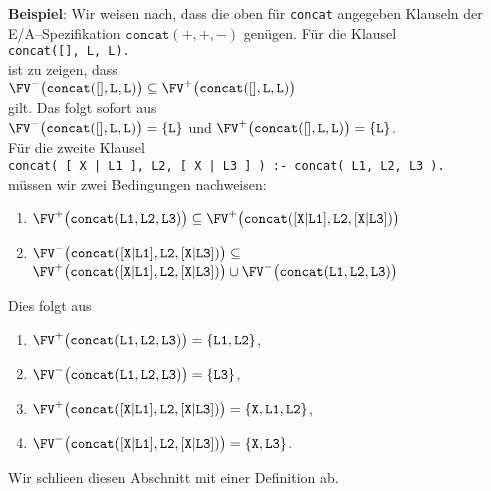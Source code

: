 \noindent
\textbf{Beispiel}: Wir weisen nach, dass die oben f\"{u}r \texttt{concat} angegeben Klauseln der E/A--Spezifikation
$\texttt{concat}(+,+,-)$ gen\"{u}gen. F\"{u}r die Klausel \\[0.1cm]
\hspace*{1.3cm} \texttt{concat([], L, L).} \\[0.1cm]
ist zu zeigen, dass \\[0.1cm]
\hspace*{1.3cm} $\FV^-\big(\mathtt{concat}(\mathtt{[]}, \mathtt{L}, \mathtt{L})\big) \subseteq \FV^+\big(\mathtt{concat}(\mathtt{[]}, \mathtt{L}, \mathtt{L})\big)$ \\[0.1cm]
gilt.  Das folgt sofort aus \\[0.1cm]
\hspace*{1.3cm}  $\FV^-\big(\mathtt{concat}(\mathtt{[]}, \mathtt{L}, \mathtt{L})\big) = \{ \mathtt{L} \}$ und $\FV^+\big(\mathtt{concat}(\mathtt{[]}, \mathtt{L}, \mathtt{L})\big)  = \{ \mathtt{L} \}$. \\[0.1cm]
F\"{u}r die zweite Klausel \\[0.1cm]
\hspace*{1.3cm} \texttt{concat( [ X | L1 ], L2, [ X | L3 ] ) :- concat( L1, L2, L3 ).} \\[0.1cm]
m\"{u}ssen wir zwei Bedingungen nachweisen:
\begin{enumerate}
\item $\FV^+\big(\mathtt{concat(L1,L2,L3)}\big) \subseteq \FV^+\big(\mathtt{concat([X|L1],L2,[X|L3])}\big)$
\item $\FV^-\big(\mathtt{concat([X|L1],L2,[X|L3])}\big) \subseteq$ \\
      $\FV^+\big(\mathtt{concat([X|L1],L2,[X|L3])}\big) \cup \FV^-\big(\mathtt{concat(L1,L2,L3)}\big)$
\end{enumerate}
Dies folgt aus 
\begin{enumerate}
\item $\FV^+\big(\mathtt{concat(L1,L2,L3)}\big) = \{ \mathtt{L1}, \mathtt{L2} \}$,
\item $\FV^-\big(\mathtt{concat(L1,L2,L3)}\big) = \{ \mathtt{L3} \}$,
\item $\FV^+\big(\mathtt{concat([X|L1],L2,[X|L3])}\big) = \{ \mathtt{X}, \mathtt{L1}, \mathtt{L2} \}$,
\item $\FV^-\big(\mathtt{concat([X|L1],L2,[X|L3])}\big) = \{ \mathtt{X}, \mathtt{L3} \}$.
\end{enumerate}

Wir schlie\3en diesen Abschnitt mit einer Definition ab.

